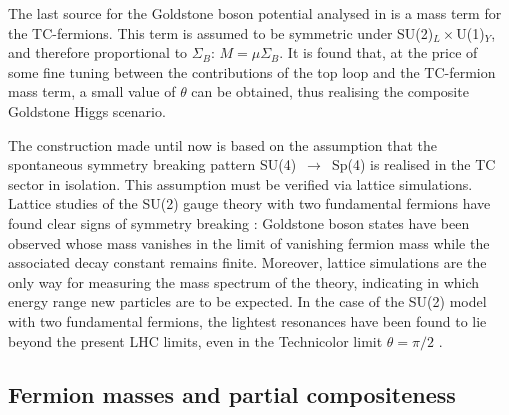 The last source for the Goldstone boson potential analysed in \cite{Cacciapaglia:2014uja} is a mass term for the TC-fermions. This term is assumed to be symmetric under SU(2)$_L \times$U(1)$_Y$, and therefore proportional to $\Sigma_B$: $M = \mu \Sigma_B$. It is found that, at the price of some fine tuning between the contributions of the top loop and the TC-fermion mass term, a small value of $\theta$ can be obtained, thus realising the composite Goldstone Higgs scenario.

The construction made until now is based on the assumption that the spontaneous symmetry breaking pattern SU(4)~$\to$~Sp(4)  is realised in the TC sector in isolation. This assumption must be verified via lattice simulations. Lattice studies of the SU(2) gauge theory with two fundamental fermions have found clear signs of symmetry breaking \cite{Arthur:2016dir}: Goldstone boson states have been observed whose mass vanishes in the limit of vanishing fermion mass while the associated decay constant remains finite. Moreover, lattice simulations are the only way for measuring the mass spectrum of the theory, indicating in which energy range new particles are to be expected. In the case of the SU(2) model with two fundamental fermions, the lightest resonances have been found to lie beyond the present LHC limits, even in the Technicolor limit $\theta = \pi/2$ \cite{Arthur:2016dir}.


\subsection{Fermion masses and partial compositeness}
\label{partial_comp}

